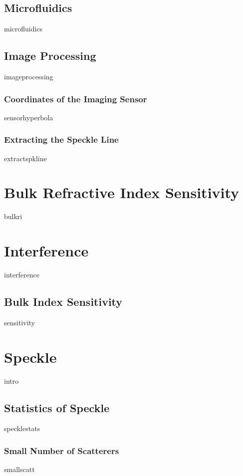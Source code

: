 \documentclass[a4paper,titlepage,onecolumn]{report}
\begin{document}
 \section{Microfluidics}
 {microfluidics}
 \section{Image Processing}
 {imageprocessing}
  \subsection{Coordinates of the Imaging Sensor}
  {sensorhyperbola}
  \subsection{Extracting the Speckle Line}
  {extractspkline}

\chapter{Bulk Refractive Index Sensitivity} \label{ch:bulkri}
{bulkri}

\chapter{Interference} \label{ch:interference}
{interference}
	\section{Bulk Index Sensitivity}
	{sensitivity}

\chapter{Speckle} \label{ch:speckle}
{intro}
 \section{Statistics of Speckle}
	{specklestats}
		\subsection{Small Number of Scatterers}
		{smallscatt}
\end{document}
